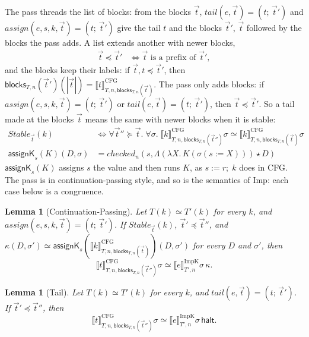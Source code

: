 \documentclass[10pt]{article}
\theoremstyle{acmplain}
\newtheorem{lemma}[theorem]{Lemma}
\newcommand{\SEM}[1]{\llbracket #1 \rrbracket}
\newcommand{\key}[1]{\mathsf{#1}}
\newcommand{\pass}[1]{\mathit{#1}}
\newcommand{\ext}[3]{#1(#2{:=}#3)}
\newcommand{\app}{\star}
\newcommand{\assign}[3]{#1 \mathrel{:=} #2;\; #3}
\begin{document}
The pass threads the list of blocks: from the blocks $\vec{t}$,
$\pass{tail}(e, \vec{t}) = (t;\, \vec{t}')$ and
$\pass{assign}(e, s, k, \vec{t}) = (t;\, \vec{t}')$ give the tail $t$
and the blocks $\vec{t}'$, $\vec{t}$ followed by the blocks the pass
adds. A list extends another with newer blocks,
\begin{align*}
  \vec{t} \preceq \vec{t}' &\iff \vec{t} \text{ is a prefix of } \vec{t}' ,
\end{align*}
and the blocks keep their labels: if $\vec{t}, t \preceq \vec{t}'$, then
$\key{blocks}_{T,n}(\vec{t}')(|\vec{t}|) = \SEM{t}^{\mathrm{CFG}}_{T,n,\key{blocks}_{T,n}(\vec{t})}$.
The pass only adds blocks: if $\pass{assign}(e, s, k, \vec{t}) = (t;\, \vec{t}')$
or $\pass{tail}(e, \vec{t}) = (t;\, \vec{t}')$, then $\vec{t} \preceq \vec{t}'$.
So a tail made at the blocks $\vec{t}$ means the same with newer blocks
when it is stable:
\begin{align*}
  \mathit{Stable}_{\vec{t}}(k) &\iff \forall \vec{t}'' \succeq \vec{t}.\; \forall \sigma.\;
    \SEM{k}^{\mathrm{CFG}}_{T,n,\key{blocks}_{T,n}(\vec{t}'')}\sigma \simeq
    \SEM{k}^{\mathrm{CFG}}_{T,n,\key{blocks}_{T,n}(\vec{t})}\sigma \\
  \key{assignK}_s(K)(D, \sigma) &= \mathit{checked}_n(s, \Lambda(\lambda X.\, K(\ext{\sigma}{s}{X})) \app D)
\end{align*}
$\key{assignK}_s(K)$ assigns $s$ the value and then runs $K$, as
$\assign{s}{r}{k}$ does in CFG. The pass is in continuation-passing
style, and so is the semantics of Imp: each case below is a congruence.

\begin{lemma}[Continuation-Passing]\label{lem:cps}
Let $T(k) \simeq T'(k)$ for every $k$, and $\pass{assign}(e, s, k, \vec{t}) = (t;\, \vec{t}')$.
If $\mathit{Stable}_{\vec{t}}(k)$, $\vec{t}' \preceq \vec{t}''$, and
$\kappa(D, \sigma') \simeq \key{assignK}_s(\SEM{k}^{\mathrm{CFG}}_{T,n,\key{blocks}_{T,n}(\vec{t})})(D, \sigma')$
for every $D$ and $\sigma'$, then
\[
  \SEM{t}^{\mathrm{CFG}}_{T,n,\key{blocks}_{T,n}(\vec{t}'')}\sigma \simeq
  \SEM{e}^{\mathrm{ImpK}}_{T',n}\sigma\,\kappa .
\]
\end{lemma}

\begin{lemma}[Tail]\label{lem:explicate-tail}
Let $T(k) \simeq T'(k)$ for every $k$, and $\pass{tail}(e, \vec{t}) = (t;\, \vec{t}')$.
If $\vec{t}' \preceq \vec{t}''$, then
\[
  \SEM{t}^{\mathrm{CFG}}_{T,n,\key{blocks}_{T,n}(\vec{t}'')}\sigma \simeq
  \SEM{e}^{\mathrm{ImpK}}_{T',n}\sigma\,\key{halt} .
\]
\end{lemma}
\end{document}

